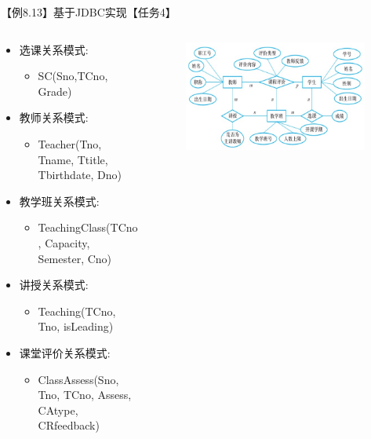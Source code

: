 \begin{frame}{【例8.13】基于JDBC实现【任务4】}
\begin{columns}
\begin{column}{0.6\textwidth}
\vspace{-2ex}
\begin{itemize}
    \item 选课关系模式:
    \begin{itemize}
        \item SC(Sno,TCno, Grade)
    \end{itemize}
    \vspace{-1ex}
    \item 教师关系模式:
    \begin{itemize}
        \item Teacher(Tno, Tname, Ttitle, Tbirthdate, Dno)
    \end{itemize} 
    \vspace{-1ex}
    \item 教学班关系模式: 
    \begin{itemize}
        \item TeachingClass(TCno, Capacity, Semester, Cno)
    \end{itemize}
    \vspace{-1ex}
    \item 讲授关系模式:
    \begin{itemize}
        \item Teaching(TCno, Tno, isLeading) 
    \end{itemize}
    \vspace{-1ex}
    \item 课堂评价关系模式: 
    \begin{itemize}
        \item ClassAssess(Sno, Tno, TCno, Assess, CAtype, CRfeedback)
    \end{itemize}
\end{itemize}
\end{column}

\begin{column}{0.4\textwidth}
\begin{figure}
    \centering
    \includegraphics[width=\textwidth]{figure/fig-14.jpg}
\end{figure}
\end{column}

\end{columns}
\end{frame}


